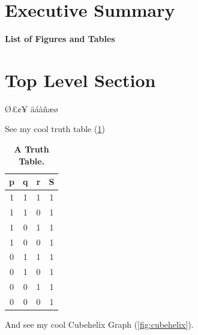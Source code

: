 \documentclass[12pt]{article}
\makeatletter
\newcommand \Dotfill {\leavevmode \cleaders \hb@xt@ .8em{\hss .\hss }\hfill \kern \z@}
\newcommand{\titlepagefigure}{Title Page Figure}
\newif\iftitlefigure
\makeatother
\begin{document}
\setcounter{page}{1}

\section{Executive Summary}
\blindtext

\clearpage
\tableofcontents
\clearpage

\begin{center}
{\fontsize{18pt}{24pt}\bfseries List of Figures and Tables}
\end{center}
\iftitlefigure
	{\hspace{6mm}\fontsize{14pt}{15pt}\hyperref[fig:titlepage]{Figure \thefigure. \titlepagefigure} \Dotfill Title Page}
\fi

\listoffigures
\listoftables
\clearpage

\setcounter{page}{1}

\section{Top Level Section}
\blindmathtrue
\blindtext

Ø£¢¥
äáàñæø

See my cool truth table (\ref{tab:truthy})

\begin{table} [h!]
\caption[Table \thetable. Truth Table]{ \textbf{A Truth Table.} } 
\begin{tabular} {c c c | c}
p & q & r & S\\ \hline
1 & 1 & 1 & 1\\
1 & 1 & 0 & 1\\
1 & 0 & 1 & 1\\
1 & 0 & 0 & 1\\
0 & 1 & 1 & 1\\
0 & 1 & 0 & 1\\
0 & 0 & 1 & 1\\
0 & 0 & 0 & 1\\
\end{tabular}
\label{tab:truthy}
\end{table}

\blindtext

And see my cool Cubehelix Graph (\ref{fig:cubehelix}).
\end{document}
